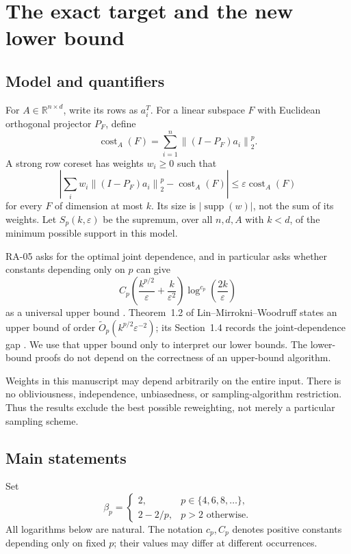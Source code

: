 \documentclass[11pt,letterpaper]{article}
\theoremstyle{definition}
\theoremstyle{remark}
\numberwithin{equation}{section}
\newcommand{\R}{\mathbb R}
\newcommand{\eps}{\varepsilon}
\newcommand{\norm}[1]{\left\lVert#1\right\rVert}
\newcommand{\abs}[1]{\left|#1\right|}
\DeclareMathOperator{\supp}{supp}
\DeclareMathOperator{\cost}{cost}
\newcommand{\littleO}{\widetilde O}
\begin{document}
\section{The exact target and the new lower bound}\label{sec:main}
\subsection{Model and quantifiers}
For $A\in\R^{n\times d}$, write its rows as $a_i^T$. For a linear subspace $F$ with Euclidean orthogonal projector $P_F$, define
\begin{equation}\label{eq:cost}
 \cost_A(F)=\sum_{i=1}^n\norm{(I-P_F)a_i}_2^p.
\end{equation}
A strong row coreset has weights $w_i\ge0$ such that
\begin{equation}\label{eq:strong}
 \abs{\sum_iw_i\norm{(I-P_F)a_i}_2^p-\cost_A(F)}
 \le\eps\cost_A(F)
\end{equation}
for every $F$ of dimension at most $k$. Its size is $|\supp(w)|$, not the sum of its weights. Let $S_p(k,\eps)$ be the supremum, over all $n,d,A$ with $k<d$, of the minimum possible support in this model.

RA-05 asks for the optimal joint dependence, and in particular asks whether constants depending only on $p$ can give
\begin{equation}\label{eq:proposed}
 C_p\left(\frac{k^{p/2}}{\eps}+\frac{k}{\eps^2}\right)
 \log^{c_p}\!\left(\frac{2k}{\eps}\right)
\end{equation}
as a universal upper bound \cite{RA05}. Theorem~1.2 of Lin--Mirrokni--Woodruff states an upper bound of order $\littleO_p(k^{p/2}\eps^{-2})$; its Section~1.4 records the joint-dependence gap \cite{LMW}. We use that upper bound only to interpret our lower bounds. The lower-bound proofs do not depend on the correctness of an upper-bound algorithm.

Weights in this manuscript may depend arbitrarily on the entire input. There is no obliviousness, independence, unbiasedness, or sampling-algorithm restriction. Thus the results exclude the best possible reweighting, not merely a particular sampling scheme.

\subsection{Main statements}
Set
\begin{equation}\label{eq:beta}
 \beta_p=\begin{cases}
 2,&p\in\{4,6,8,\ldots\},\\
 2-2/p,&p>2\text{ otherwise}.
 \end{cases}
\end{equation}
All logarithms below are natural. The notation $c_p,C_p$ denotes positive constants depending only on fixed $p$; their values may differ at different occurrences.
\end{document}
